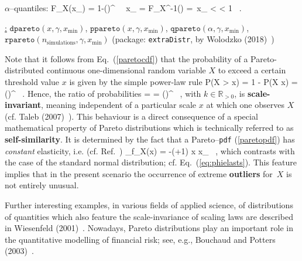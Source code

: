 \medskip
\noindent
$\alpha$--quantiles:
%
\be
{}
\alpha \stackrel{!}{=} F_{X}(x_{\alpha})
= 1-\left(\right)^{\gamma}
\ \Leftrightarrow\ 
x_{\alpha} = F_{X}^{-1}(\alpha)
= \,x_
\quad{} < \alpha < 1 \ .
\ee
%

\medskip
\noindent
\underline{\R:}
$\texttt{dpareto}(x, \gamma, x_{\mathrm{min}})$,
$\texttt{ppareto}(x, \gamma, x_{\mathrm{min}})$,
$\texttt{qpareto}(\alpha, \gamma, x_{\mathrm{min}})$, \\
$\texttt{rpareto}(n_{\mathrm{simulations}}, \gamma,
x_{\mathrm{min}})$ (package: {\tt extraDistr}, by Wolodzko
(2018)~)

\medskip
\noindent
Note that it follows from Eq.~(\ref{paretocdf}) that the 
probability of a Pareto-distributed continuous one-dimensional 
random variable $X$ to exceed a certain threshold value $x$ is 
given by the simple power-law rule
%
\be
P(X > x)
= 1 - P(X \leq x)
= \left(\right)^{\gamma} \ .
\ee
%
Hence, the ratio of probabilities
%
\be
{}
=
= \left(\right)^{\gamma} \ ,
\ee
%
with $k \in \mathbb{R}_{>0}$, is \textbf{scale-invariant}, meaning
independent of a particular scale $x$ at which one observes $X$ 
(cf. Taleb (2007)~\ct[p~256ff and p~326ff]{tal2007}). This 
behaviour is a direct consequence of a special mathematical 
property of Pareto distributions which is technically referred to 
as \textbf{self-similarity}. It is determined by the fact that 
a Pareto--\texttt{pdf} (\ref{paretopdf}) has \textit{constant}
elasticity, i.e. (cf. Ref.~)
%
\be
\varepsilon_{f_{X}}(x) = -(\gamma+1)
\quad{}\quad x \geq x_ \ ,
\ee
%
which contrasts with the case of the standard normal 
distribution; cf. Eq.~(\ref{eq:phielasts}). This feature implies
that in the present scenario the occurrence of extreme
\textbf{outliers} for~$X$ is not entirely unusual.

\medskip
\noindent
Further interesting examples, in various fields of applied science,
of distributions of quantities which also feature the 
scale-invariance of scaling laws are described in 
Wiesenfeld (2001)~. Nowadays, Pareto distributions 
play an important role in the quantitative modelling of financial 
risk; see, e.g., Bouchaud and Potters (2003)~\ct{boupot2003}.

